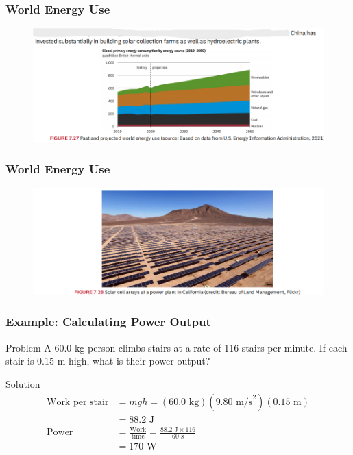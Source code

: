\documentclass{beamer}
\begin{document}
\begin{frame}
\frametitle{World Energy Use}
\begin{figure}
    \centering
    \includegraphics[width=1\linewidth]{CH7/CH7.7-7.9/Screenshot 2024-11-28 1202152.png}
\end{figure}

\end{frame}
\begin{frame}
\frametitle{World Energy Use}
\begin{figure}
    \centering
    \includegraphics[width=1\linewidth]{CH7/CH7.7-7.9/Screenshot 2024-11-28 120215.png}
\end{figure}

\end{frame}
\begin{frame}
\frametitle{Example: Calculating Power Output}
\begin{block}{Problem}
A 60.0-kg person climbs stairs at a rate of 116 stairs per minute. If each stair is 0.15 m high, what is their power output?
\end{block}

\pause

\begin{block}{Solution}
\begin{align*}
\text{Work per stair} &= mgh = (60.0\text{ kg})(9.80\text{ m/s}^2)(0.15\text{ m}) \\
&= 88.2\text{ J} \\
\text{Power} &= \frac{\text{Work}}{\text{time}} = \frac{88.2\text{ J} \times 116}{60\text{ s}} \\
&= 170\text{ W}
\end{align*}
\end{block}
\end{frame}
\end{document}
